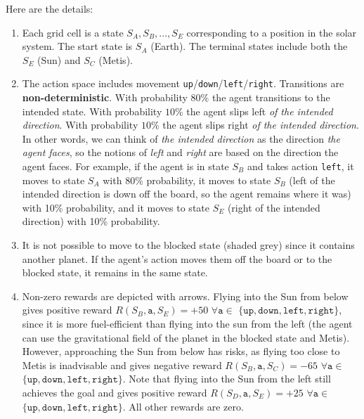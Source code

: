 \documentclass[11pt,addpoints,answers]{exam}
\begin{document}
\begin{questions}
\begin{center}
\begin{tikzpicture}
\end{tikzpicture}
\end{center}


Here are the details:

\begin{enumerate}
    \item Each grid cell is a state $S_A, S_B,..., S_E$ corresponding to a position in the solar system. The start state is $S_A$ (Earth). The terminal states include both the $S_E$ (Sun) and $S_C$ (Metis).
    \item The action space includes movement \texttt{up}/\texttt{down}/\texttt{left}/\texttt{right}. Transitions are \textbf{non-deterministic}. With probability $80\%$ the agent transitions to the intended state. With probability $10\%$ the agent slips left \emph{of the intended direction}. With probability $10\%$ the agent slips right \emph{of the intended direction}. In other words, we can think of \emph{the intended direction} as the direction \emph{the agent faces}, so the notions of \emph{left} and \emph{right} are based on the direction the agent faces. For example, if the agent is in state $S_B$ and takes action \texttt{left},  it moves to state $S_A$ with 80\% probability, it moves to state $S_B$ (left of the intended direction is down off the board, so the agent remains where it was) with 10\% probability, and it moves to state $S_E$ (right of the intended direction)  with 10\% probability.
    \item It is not possible to move to the blocked state (shaded grey) since it contains another planet. If the agent's action moves them off the board or to the blocked state, it remains in the same state.
    \item Non-zero rewards are depicted with arrows. Flying into the Sun from below gives positive reward $R(S_B, \texttt{a}, S_E) = +50$ $\forall \texttt{a} \in$ $\{\texttt{up},\texttt{down},\texttt{left},\texttt{right}\}$, since it is more fuel-efficient than flying into the sun from the left (the agent can use the gravitational field of the planet in the blocked state and Metis). However, approaching the Sun from below has risks, as flying too close to Metis is inadvisable and gives negative reward $R(S_B, \texttt{a}, S_C) = -65$ $\forall \texttt{a} \in$ $\{\texttt{up},\texttt{down},\texttt{left},\texttt{right}\}$. Note that flying into the Sun from the left still achieves the goal and gives positive reward $R(S_D, \texttt{a}, S_E) = +25$ $\forall \texttt{a} \in$ $\{\texttt{up},\texttt{down},\texttt{left},\texttt{right}\}$. All other rewards are zero.
\end{enumerate}


\end{questions}
\end{document}
